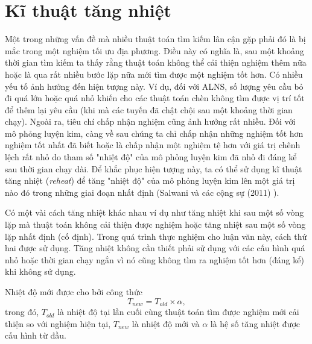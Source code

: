 \section{Kĩ thuật tăng nhiệt}
\label{sec:reheat}
Một trong những vấn đề mà nhiều thuật toán tìm kiếm lân cận gặp phải đó là bị mắc trong một nghiệm tối ưu địa phương. Điều này có nghĩa là, sau một khoảng thời gian tìm kiếm ta thấy rằng thuật toán không thể cải thiện nghiệm thêm nữa hoặc là qua rất nhiều bước lặp nữa mới tìm được một nghiệm tốt hơn. Có nhiều yếu tố ảnh hưởng đến hiện tượng này. Ví dụ, đối với ALNS, số lượng yêu cầu bỏ đi quá lớn hoặc quá nhỏ khiến cho các thuật toán chèn không tìm được vị trí tốt để thêm lại yêu cầu (khi mà các tuyến đã chật chội sau một khoảng thời gian chạy). Ngoài ra, tiêu chí chấp nhận nghiệm cũng ảnh hưởng rất nhiều. Đối với mô phỏng luyện kim, càng về sau chúng ta chỉ chấp nhận những nghiệm tốt hơn nghiệm tốt nhất đã biết hoặc là chấp nhận một nghiệm tệ hơn với giá trị chênh lệch rất nhỏ do tham số "nhiệt độ" của mô phỏng luyện kim đã nhỏ đi đáng kể sau thời gian chạy dài. Để khắc phục hiện tượng này, ta có thể sử dụng kĩ thuật tăng nhiệt (\textit{reheat}) để tăng "nhiệt độ" của mô phỏng luyện kim lên một giá trị nào đó trong những giai đoạn nhất định (Salwani và các cộng sự (2011) \cite{salwani2011re}). 

Có một vài cách tăng nhiệt khác nhau ví dụ như tăng nhiệt khi sau một số vòng lặp mà thuật toán không cải thiện được nghiệm hoặc tăng nhiệt sau một số vòng lặp nhất định (cố định). Trong quá trình thực nghiệm cho luận văn này, cách thứ hai được sử dụng. Tăng nhiệt không cần thiết phải sử dụng với các cấu hình quá nhỏ hoặc thời gian chạy ngắn vì nó cũng không tìm ra nghiệm tốt hơn (đáng kể) khi không sử dụng. 

Nhiệt độ mới được cho bởi công thức
\begin{equation}
  T_{new} = T_{old} \times \alpha,
\end{equation}
trong đó, $T_{old}$ là nhiệt độ tại lần cuối cùng thuật toán tìm được nghiệm mới cải thiện so với nghiệm hiện tại, $T_{new}$ là nhiệt độ mới và $\alpha$ là hệ số tăng nhiệt được cấu hình từ đầu.

